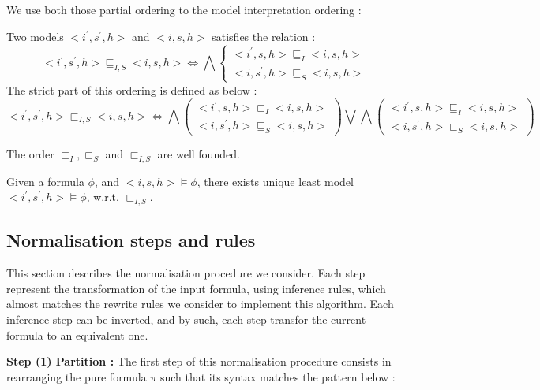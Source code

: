 \documentclass[a4paper,twoside,12pt]{report}
\newcommand{\LocOrderIneq}[0]{\sqsubset_{I}}
\newcommand{\LocOrderIeq}[0]{\sqsubseteq_{I}}
\newcommand{\PtrOrderIneq}[0]{\sqsubset_{S}}
\newcommand{\PtrOrderIeq}[0]{\sqsubseteq_{S}}
\newcommand{\ModOrderIeq}[0]{\sqsubseteq_{I,S}}
\newcommand{\ModOrderIneq}[0]{\sqsubset_{I,S}}
\begin{document}
We use both those partial ordering to the model interpretation ordering  :

\begin{definition}
Two models $<i^{\prime},s^{\prime},h>$ and $<i,s,h>$ satisfies the
relation : 
$$ <i^{\prime},s^{\prime},h> \ModOrderIeq <i,s,h> \Leftrightarrow \bigwedge \left \lbrace \begin{array}{l} <i^{\prime},s,h> \LocOrderIeq <i,s,h> \\
		<i,s^{\prime},h> \PtrOrderIeq <i,s,h>
\end{array} \right .$$
The strict part of this ordering is defined as below :
$$ <i^{\prime},s^{\prime},h> \ModOrderIneq <i,s,h> \Leftrightarrow \bigwedge \left ( \begin{array}{l} <i^{\prime},s,h> \LocOrderIneq <i,s,h> \\
		<i,s^{\prime},h> \PtrOrderIeq <i,s,h>
\end{array} \right ) \bigvee \bigwedge \left ( \begin{array}{l} <i^{\prime},s,h> \LocOrderIeq <i,s,h> \\
		<i,s^{\prime},h> \PtrOrderIneq <i,s,h>
\end{array} \right ) $$

\end{definition}


\begin{lemma}
The order $\LocOrderIneq,\PtrOrderIneq$ and $\ModOrderIneq$ are well founded.
\end{lemma}



\begin{lemma}
Given a formula $\phi$, and $<i,s,h>\models \phi$, there exists unique
least model $<i^{\prime},s^{\prime},h>\models \phi$, w.r.t. $\ModOrderIneq$.
\end{lemma}


\subsection{Normalisation steps and rules}
This section describes the normalisation procedure we consider. Each step
represent the transformation of the input formula, using inference rules,
which almost matches the rewrite rules we consider to implement this
algorithm. Each inference step can be inverted, and by such, each step 
transfor the current formula to an equivalent one.

{\bf Step (1)  Partition :}
The first step of this normalisation procedure consists in rearranging
the pure formula $\pi$ such that its syntax matches the pattern below :
\end{document}
